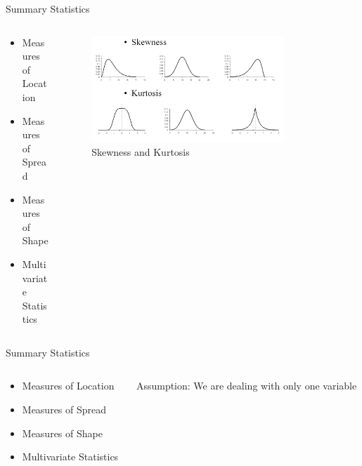 \documentclass[10pt,aspectratio=169]{beamer} %
\newcommand{\hide}[1] {
	\textcolor{hiddencolor}{#1}
}
\begin{document}
\begin{frame}{Summary Statistics}
\begin{columns}[c]
\begin{column}{0.35\textwidth}
\begin{itemize}
\item \hide{Measures of Location}
\item \hide{Measures of Spread}
\item \alert{Measures of Shape}
\item \hide{Multivariate Statistics}
\end{itemize}
\end{column}

\begin{column}{0.65\textwidth}
\begin{figure}
    \includegraphics[width=0.8\textwidth]{measure_shape.png}
    \caption{Skewness and Kurtosis}
\end{figure}
\end{column}
\end{columns}
\end{frame}

\begin{frame}{Summary Statistics}
\begin{columns}[c]
\begin{column}{0.35\textwidth}
\begin{itemize}
\item \hide{Measures of Location}
\item \hide{Measures of Spread}
\item \hide{Measures of Shape}
\item \alert{Multivariate Statistics}
\end{itemize}
\end{column}

\begin{column}{0.65\textwidth}
Assumption: We are dealing with only one variable
\end{column}
\end{columns}
\end{frame}
\end{document}
